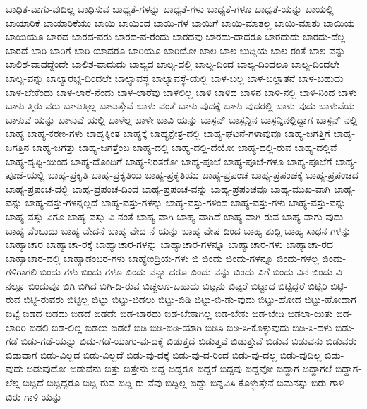 {ಬಾಧಿತ-ವಾಗು-ವುದಿಲ್ಲ
ಬಾಧಿಸುವ
ಬಾಧ್ಯತೆ-ಗಳನ್ನು
ಬಾಧ್ಯತೆ-ಗಳು
ಬಾಧ್ಯತೆ-ಗಳೂ
ಬಾಧ್ಯತೆ-ಯನ್ನು
ಬಾಯಲ್ಲಿ
ಬಾಯಾರಿಕೆ
ಬಾಯಾರಿಕೆಯು
ಬಾಯಿ
ಬಾಯಿಂದ
ಬಾಯಿ-ಗಳ
ಬಾಯಿಗೆ
ಬಾಯಿ-ಮಾತಲ್ಲ
ಬಾಯಿ-ಮಾತು
ಬಾಯಿಯ
ಬಾಯಿಯೂ
ಬಾರದ
ಬಾರದ-ವರು
ಬಾರದ-ವ-ರೆಂದು
ಬಾರದವು
ಬಾರದು-ದಾದರೂ
ಬಾರದುದು
ಬಾರದು-ದೆಲ್ಲ
ಬಾರದೆ
ಬಾರಿ
ಬಾರಿಗೆ
ಬಾರಿ-ಯಾದರೂ
ಬಾರಿಯೂ
ಬಾರಿಯೋ
ಬಾಲ
ಬಾಲ-ಬುದ್ದಿಯ
ಬಾಲ-ರಂತೆ
ಬಾಲ-ವನ್ನು
ಬಾಲಿಶ-ವಾದದ್ದೆಂದೇ
ಬಾಲಿಶ-ವಾದುದು
ಬಾಲ್ಯದ
ಬಾಲ್ಯ-ದಲ್ಲಿ
ಬಾಲ್ಯ-ದಿಂದ
ಬಾಲ್ಯ-ದಿಂದಲೂ
ಬಾಲ್ಯ-ದಿಂದಲೇ
ಬಾಲ್ಯ-ವನ್ನು
ಬಾಲ್ಯಾರಭ್ಯ-ದಿಂದಲೇ
ಬಾಲ್ಯಾವಸ್ಥೆ
ಬಾಲ್ಯಾವಸ್ಥೆ-ಯಲ್ಲಿ
ಬಾಳ-ಬಲ್ಲ
ಬಾಳ-ಬಲ್ಲಾತನೆ
ಬಾಳ-ಬಹುದು
ಬಾಳ-ಬೇಕೆಂದು
ಬಾಳ-ಲಾರೆ-ನೆಂದು
ಬಾಳ-ಲಾರೆವು
ಬಾಳಲಿಲ್ಲ
ಬಾಳಿ
ಬಾಳಿದ
ಬಾಳಿನ
ಬಾಳಿ-ನಲ್ಲಿ
ಬಾಳಿ-ನಿಂದ
ಬಾಳು
ಬಾಳು-ತ್ತಿರು-ವರು
ಬಾಳುತ್ತಿಲ್ಲ
ಬಾಳುತ್ತೇವೆ
ಬಾಳು-ವಂತೆ
ಬಾಳು-ವುದಕ್ಕೆ
ಬಾಳು-ವುದರಲ್ಲಿ
ಬಾಳು-ವುದು
ಬಾಳುವೆಯ
ಬಾಳುವೆ-ಯನ್ನು
ಬಾಳುವೆ-ಯಲ್ಲಿ
ಬಾಳೆಲ್ಲ
ಬಾಳೇ
ಬಾವಿ-ಯನ್ನು
ಬಾಸ್ಟನ್
ಬಾಸ್ಟನ್ನಿನ
ಬಾಸ್ಟನ್ನಿನಲ್ಲಿದ್ದಾಗ
ಬಾಸ್ಟನ್-ನಲ್ಲಿ
ಬಾಹ್ಯ
ಬಾಹ್ಯ-ಕರಣ-ಗಳು
ಬಾಹ್ಯಕ್ಕಿಂತ
ಬಾಹ್ಯಕ್ಕೆ
ಬಾಹ್ಯಕ್ಷೇತ್ರ-ದಲ್ಲಿ
ಬಾಹ್ಯ-ಘಟನೆ-ಗಳಾವುವೂ
ಬಾಹ್ಯ-ಜಗತ್ತಿಗೆ
ಬಾಹ್ಯ-ಜಗತ್ತಿನ
ಬಾಹ್ಯ-ಜಗತ್ತು
ಬಾಹ್ಯ-ಜಗತ್ತೆಂಬ
ಬಾಹ್ಯ-ದಲ್ಲಿ
ಬಾಹ್ಯ-ದಲ್ಲಿ-ದೆಯೋ
ಬಾಹ್ಯ-ದಲ್ಲಿ-ರುವ
ಬಾಹ್ಯ-ದಲ್ಲಿವೆ
ಬಾಹ್ಯ-ದೃಷ್ಟಿ-ಯಿಂದ
ಬಾಹ್ಯ-ದೊಂದಿಗೆ
ಬಾಹ್ಯ-ನಿರತರೋ
ಬಾಹ್ಯ-ಪೂಜೆ
ಬಾಹ್ಯ-ಪೂಜೆ-ಗಳೂ
ಬಾಹ್ಯ-ಪೂಜೆಗೆ
ಬಾಹ್ಯ-ಪೂಜೆ-ಯಲ್ಲಿ
ಬಾಹ್ಯ-ಪ್ರಕೃತಿ
ಬಾಹ್ಯ-ಪ್ರಕೃತಿಯ
ಬಾಹ್ಯ-ಪ್ರಕೃತಿಯು
ಬಾಹ್ಯ-ಪ್ರಪಂಚ
ಬಾಹ್ಯ-ಪ್ರಪಂಚಕ್ಕೆ
ಬಾಹ್ಯ-ಪ್ರಪಂಚದ
ಬಾಹ್ಯ-ಪ್ರಪಂಚ-ದಲ್ಲಿ
ಬಾಹ್ಯ-ಪ್ರಪಂಚ-ದಿಂದ
ಬಾಹ್ಯ-ಪ್ರಪಂಚ-ವನ್ನು
ಬಾಹ್ಯ-ಪ್ರಪಂಚವೂ
ಬಾಹ್ಯ-ಮುಖ-ವಾಗಿ
ಬಾಹ್ಯ-ವನ್ನು
ಬಾಹ್ಯ-ವಸ್ತು-ಗಳನ್ನಲ್ಲದೆ
ಬಾಹ್ಯ-ವಸ್ತು-ಗಳನ್ನು
ಬಾಹ್ಯ-ವಸ್ತು-ಗಳಿಂದ
ಬಾಹ್ಯ-ವಸ್ತು-ಗಳು
ಬಾಹ್ಯ-ವಸ್ತು-ವನ್ನು
ಬಾಹ್ಯ-ವಸ್ತು-ವಿಗೂ
ಬಾಹ್ಯ-ವಸ್ತು-ವಿ-ನಂತೆ
ಬಾಹ್ಯ-ವಾಗಿ
ಬಾಹ್ಯ-ವಾಗಿದೆ
ಬಾಹ್ಯ-ವಾಗಿ-ರುವ
ಬಾಹ್ಯ-ವಾಗು-ವುದು
ಬಾಹ್ಯ-ವೆಂಬುದು
ಬಾಹ್ಯ-ವೇದನೆ
ಬಾಹ್ಯ-ವೇದ-ನೆ-ಯನ್ನು
ಬಾಹ್ಯ-ವೇಷ-ದಿಂದ
ಬಾಹ್ಯ-ಶುದ್ದಿ
ಬಾಹ್ಯ-ಸಾಧನ-ಗಳನ್ನು
ಬಾಹ್ಯಾಚಾರ
ಬಾಹ್ಯಾಚಾ-ರಕ್ಕೆ
ಬಾಹ್ಯಾಚಾರ-ಗಳನ್ನು
ಬಾಹ್ಯಾಚಾರ-ಗಳನ್ನೂ
ಬಾಹ್ಯಾಚಾರ-ಗಳು
ಬಾಹ್ಯಾಚಾ-ರದ
ಬಾಹ್ಯಾಚಾರ-ದಲ್ಲಿ
ಬಾಹ್ಯಾಡಂಬರ-ಗಳು
ಬಾಹ್ಯೇಂದ್ರಿಯ-ಗಳು
ಬಿ
ಬಿಂದು
ಬಿಂದು-ಗಳನ್ನೂ
ಬಿಂದು-ಗಳಲ್ಲ
ಬಿಂದು-ಗಳಿಗಾಗಲಿ
ಬಿಂದು-ಗಳು
ಬಿಂದು-ಗಳೂ
ಬಿಂದು-ವನ್ನಾ-ದರೂ
ಬಿಂದು-ವನ್ನು
ಬಿಂದು-ವಿಗೆ
ಬಿಂದು-ವಿನ
ಬಿಂದು-ವಿ-ನಲ್ಲೂ
ಬಿಂದುವೂ
ಬಿಗಿ
ಬಿಗಿದ
ಬಿಗಿ-ದಿ-ರುವ
ಬಿಚ್ಚಲೂ-ಬಹುದು
ಬಿಟ್ಟನು
ಬಿಟ್ಟರೆ
ಬಿಟ್ಟಾದ
ಬಿಟ್ಟಿದ್ದರೆ
ಬಿಟ್ಟಿರಿ
ಬಿಟ್ಟಿ-ರುವ
ಬಿಟ್ಟಿ-ರುವರು
ಬಿಟ್ಟಿಲ್ಲ
ಬಿಟ್ಟು
ಬಿಟ್ಟು-ಬಿಡಲು
ಬಿಟ್ಟು-ಬಿಡಿ
ಬಿಟ್ಟು-ಬಿ-ಡು-ವುದು
ಬಿಟ್ಟು-ಹೋದ
ಬಿಟ್ಟು-ಹೋದಾಗ
ಬಿಟ್ಟೆ
ಬಿಡದ
ಬಿಡದು
ಬಿಡದೆ
ಬಿಡದೇ
ಬಿಡ-ಬಾರದು
ಬಿಡ-ಬೇಕಾಗಿಲ್ಲ
ಬಿಡ-ಬೇಕು
ಬಿಡ-ಬೇಡಿ
ಬಿಡಲಾ-ಯಿತು
ಬಿಡ-ಲಾರಿರಿ
ಬಿಡಲಿ
ಬಿಡ-ಲಿಲ್ಲ
ಬಿಡಲು
ಬಿಡಲೆ
ಬಿಡಿ
ಬಿಡಿ-ಬಿಡಿ-ಯಾಗಿ
ಬಿಡಿಸಿ
ಬಿಡಿ-ಸಿ-ಕೊಳ್ಳುವುದು
ಬಿಡಿ-ಸಿ-ದಳು
ಬಿಡು-ಗಡೆ
ಬಿಡು-ಗಡೆ-ಯನ್ನು
ಬಿಡು-ಗಡೆ-ಯಾಗು-ವು-ದಕ್ಕೆ
ಬಿಡುತ್ತದೆ
ಬಿಡುತ್ತವೆ
ಬಿಡುತ್ತೇವೆ
ಬಿಡುವ
ಬಿಡುವನು
ಬಿಡುವರು
ಬಿಡುವಾಗ
ಬಿಡು-ವಿಲ್ಲದ
ಬಿಡು-ವಿಲ್ಲದೆ
ಬಿಡು-ವು-ದಕ್ಕೆ
ಬಿಡು-ವು-ದ-ರಿಂದ
ಬಿಡು-ವು-ದಲ್ಲ
ಬಿಡು-ವುದಿಲ್ಲ
ಬಿಡು-ವುದು
ಬಿಡುವುದೋ
ಬಿಡುವೆನು
ಬಿತ್ತು
ಬಿತ್ತೇನು
ಬಿದ್ದ
ಬಿದ್ದರೂ
ಬಿದ್ದರೆ
ಬಿದ್ದವು
ಬಿದ್ದವೋ
ಬಿದ್ದಾಗ
ಬಿದ್ದಾಗಲೆ
ಬಿದ್ದಾಗ-ಲೆಲ್ಲ
ಬಿದ್ದಿದೆ
ಬಿದ್ದಿದ್ದರೂ
ಬಿದ್ದಿ-ರುವ
ಬಿದ್ದಿ-ರು-ವೆವು
ಬಿದ್ದಿಲ್ಲ
ಬಿದ್ದು
ಬಿನ್ನವಿಸಿ-ಕೊಳ್ಳುತ್ತೇನೆ
ಬಿಮನಸ್ಸು
ಬಿರು-ಗಾಳಿ
ಬಿರು-ಗಾಳಿ-ಯನ್ನು
}
